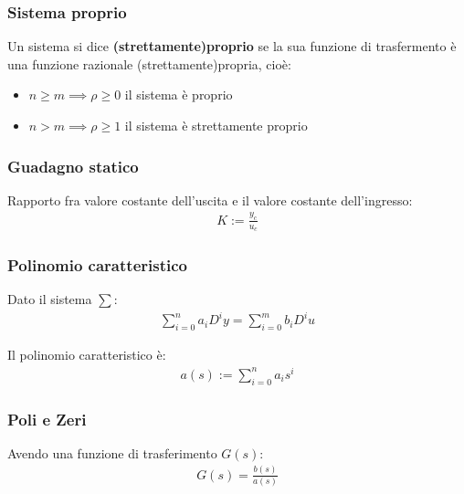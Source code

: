 \subsubsection{Sistema proprio} %
\label{sec:Sistema proprio}
Un sistema si dice \textbf{(strettamente)proprio} se la sua funzione di trasfermento è una funzione razionale (strettamente)propria, cioè:
\begin{itemize}
  \item $n \geq m \implies \rho \geq 0$ il sistema è proprio
  \item $n > m \implies \rho \geq 1$ il sistema è strettamente proprio
\end{itemize}


\subsubsection{Guadagno statico} %
\label{sec:Guadagno statico}

Rapporto fra valore costante dell'uscita e il valore costante dell'ingresso:
\begin{align}
  K := \frac{y_c}{u_c}
\end{align}


\subsubsection{Polinomio caratteristico} %
\label{sec:Polinomio caratteristico}

Dato il sistema $\sum$:
\begin{align}
  \sum_{i=0}^n a_i D^{i} y = \sum_{i=0}^m b_i D^{i} u
\end{align}

Il polinomio caratteristico è:
\begin{align}
  a(s) := \sum_{i=0}^n a_i s^i
\end{align}


\subsubsection{Poli e Zeri} %
\label{sec:Poli e Zeri}
Avendo una funzione di trasferimento $G(s)$:
\begin{align}
  G(s) = \frac{b(s)}{a(s)}
\end{align}

